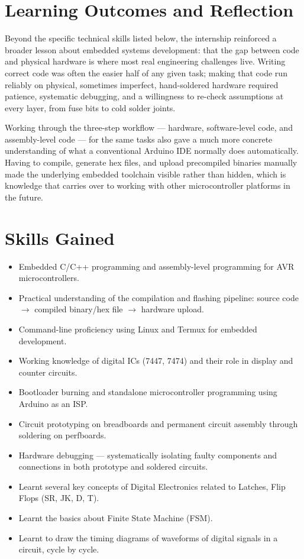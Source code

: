 \documentclass[12pt,a4paper]{report}
\begin{document}
\chapter{Learning Outcomes and Reflection}
\label{ch:outcomes}

Beyond the specific technical skills listed below, the internship reinforced a broader lesson about embedded systems development: that the gap between code and physical hardware is where most real engineering challenges live. Writing correct code was often the easier half of any given task; making that code run reliably on physical, sometimes imperfect, hand-soldered hardware required patience, systematic debugging, and a willingness to re-check assumptions at every layer, from fuse bits to cold solder joints.

Working through the three-step workflow --- hardware, software-level code, and assembly-level code --- for the same tasks also gave a much more concrete understanding of what a conventional Arduino IDE normally does automatically. Having to compile, generate hex files, and upload precompiled binaries manually made the underlying embedded toolchain visible rather than hidden, which is knowledge that carries over to working with other microcontroller platforms in the future.

\chapter{Skills Gained}
\label{ch:skills}

\begin{itemize}
    \item Embedded C/C++ programming and assembly-level programming for AVR microcontrollers.
    \item Practical understanding of the compilation and flashing pipeline: source code $\rightarrow$ compiled binary/hex file $\rightarrow$ hardware upload.
    \item Command-line proficiency using Linux and Termux for embedded development.
    \item Working knowledge of digital ICs (7447, 7474) and their role in display and counter circuits.
    \item Bootloader burning and standalone microcontroller programming using Arduino as an ISP.
    \item Circuit prototyping on breadboards and permanent circuit assembly through soldering on perfboards.
    \item Hardware debugging --- systematically isolating faulty components and connections in both prototype and soldered circuits.
    \item Learnt several key concepts of Digital Electronics related to Latches, Flip Flops (SR, JK, D, T).
    \item Learnt the basics about Finite State Machine (FSM).
    \item Learnt to draw the timing diagrams of waveforms of digital signals in a circuit, cycle by cycle.
\end{itemize}
\end{document}
